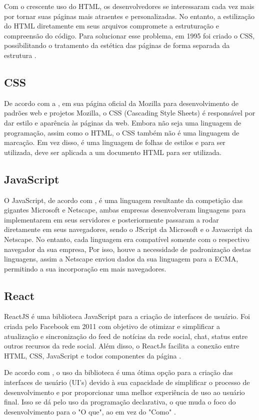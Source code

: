 Com o crescente uso do HTML, os desenvolvedores se interessaram cada vez mais por tornar suas páginas mais atraentes e personalizadas. No entanto, a estilização do HTML diretamente em seus arquivos compromete a estruturação e compreensão do código. Para solucionar esse problema, em 1995 foi criado o CSS, possibilitando o tratamento da estética das páginas de forma separada da estrutura \cite{Ballerini}.

\subsection{CSS}
De acordo com a , em sua página oficial da Mozilla para desenvolvimento de padrões web e projetos Mozilla, o CSS (Cascading Style Sheets) é responsável por dar estilo e aparência às páginas da web. Embora não seja uma linguagem de programação, assim como o HTML, o CSS também não é uma linguagem de marcação. Em vez disso, é uma linguagem de folhas de estilos e para ser utilizada, deve ser aplicada a um documento HTML para ser utilizada.

\subsection{JavaScript}
O JavaScript, de acordo com , é uma linguagem resultante da competição das gigantes Microsoft e Netscape, ambas empresas desenvolveram linguagens para implementarem em seus servidores e posteriormente passaram a rodar diretamente em seus navegadores, sendo o JScript da Microsoft e o Javascript da Netscape. No entanto, cada linguagem era compatível somente com o respectivo navegador da sua empresa,  Por isso, houve a necessidade de padronização destas linguagens, assim a Netscape enviou dados da sua linguagem para a \gls{ECMA}, permitindo a sua incorporação em mais navegadores.

\newpage
\subsection{React}
ReactJS é uma biblioteca JavaScript para a criação de interfaces de usuário. Foi criada pelo Facebook em 2011 com objetivo de otimizar e simplificar a atualização e sincronização do feed de notícias da rede social, chat, status entre outros recursos da rede social. Além disso, o ReactJs facilita a conexão entre HTML, CSS, JavaScript e todos componentes da página \cite{Roveda}.

De acordo com , o uso da biblioteca é uma ótima opção para a criação das interfaces de usuário (\gls{UI}’s) devido à sua capacidade de simplificar o processo de desenvolvimento e por proporcionar uma melhor experiência de uso ao usuário final.  Isso se dá pelo uso da programação declarativa, o que muda o foco do desenvolvimento para o "O que", ao em vez do "Como" \cite{Prata}.

